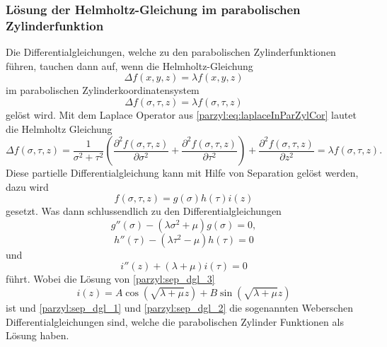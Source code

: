 \subsubsection{Lösung der Helmholtz-Gleichung im parabolischen Zylinderfunktion}
Die Differentialgleichungen, welche zu den parabolischen Zylinderfunktionen führen, tauchen
dann auf, wenn die Helmholtz-Gleichung
\begin{equation}
	\Delta f(x,y,z) = \lambda f(x,y,z) 
\end{equation}
im parabolischen Zylinderkoordinatensystem
\begin{equation}
	\Delta f(\sigma,\tau,z) = \lambda f(\sigma,\tau,z) 
\end{equation}
gelöst wird.
Mit dem Laplace Operator aus \eqref{parzyl:eq:laplaceInParZylCor} lautet die Helmholtz Gleichung
\begin{equation}
	\Delta f(\sigma, \tau, z)
	=
	\frac{1}{\sigma^2 + \tau^2}
	\left ( 
	\frac{\partial^2 f(\sigma,\tau,z)}{\partial \sigma^2} 
	+ 
	\frac{\partial^2 f(\sigma,\tau,z)}{\partial \tau^2}
	\right )
	+ 
	\frac{\partial^2 f(\sigma,\tau,z)}{\partial z^2}
	= 
	\lambda f(\sigma,\tau,z).
\end{equation}
Diese partielle Differentialgleichung kann mit Hilfe von Separation gelöst werden, dazu wird 
\begin{equation}
	f(\sigma,\tau,z) = g(\sigma)h(\tau)i(z)
\end{equation}
gesetzt. 
Was dann schlussendlich zu den Differentialgleichungen 
\begin{equation}\label{parzyl:sep_dgl_1}
	g''(\sigma) 
	- 
	\left (
	\lambda\sigma^2
	+
	\mu 
	\right )
	g(\sigma)
	=
	0,
\end{equation}
\begin{equation}\label{parzyl:sep_dgl_2}
	h''(\tau) 
	- 
	\left (
	\lambda\tau^2
	-
	\mu 
	\right )
	h(\tau)
	=
	0
\end{equation}
und
\begin{equation}\label{parzyl:sep_dgl_3}
	i''(z) 
	+
	\left (
	\lambda
	+
	\mu 
	\right )
	i(\tau)
	=
	0
\end{equation}
führt.
Wobei die Lösung von \eqref{parzyl:sep_dgl_3}
\begin{equation}
	i(z) 
	= 
	A\cos{ 
		\left ( 
		\sqrt{\lambda + \mu}z
		\right )}
	+
	B\sin{ 
		\left ( 
		\sqrt{\lambda + \mu}z
		\right )}
\end{equation}
ist und \eqref{parzyl:sep_dgl_1} und \eqref{parzyl:sep_dgl_2} die sogenannten Weberschen Differentialgleichungen sind, welche die parabolischen Zylinder Funktionen als Lösung haben.



